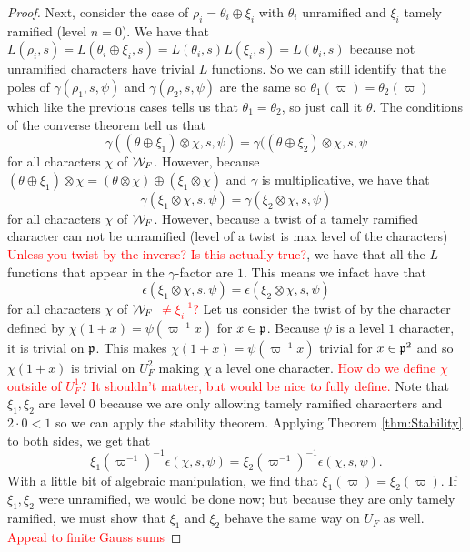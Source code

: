 \begin{proof}
  Next, consider the case of $\rho_i = \theta_i \oplus \xi_i$ with $\theta_i$ unramified and $\xi_i$ tamely ramified (level $n = 0$).
  We have that $L(\rho_i,s) = L(\theta_i \oplus \xi_i ,s) = L(\theta_i,s)L(\xi_i,s) = L(\theta_i,s)$ because not unramified characters have trivial $L$ functions.
  So we can still identify that the poles of $\gamma(\rho_1,s,\psi)$ and $\gamma(\rho_2,s,\psi)$ are the same so $\theta_1(\varpi) = \theta_2(\varpi)$ which like the previous cases tells us that $\theta_1 = \theta_2$, so just call it $\theta$.
  The conditions of the converse theorem tell us that
  \[ \gamma((\theta \oplus \xi_1) \otimes \chi,s,\psi) = \gamma((\theta \oplus \xi_2) \otimes \chi,s,\psi\]
  for all characters $\chi$ of $\mathcal{W}_F$.
  However, because $(\theta \oplus \xi_1)\otimes \chi = (\theta \otimes \chi) \oplus (\xi_1 \otimes \chi)$ and $\gamma$ is multiplicative, we have that
  \[\gamma (\xi_1 \otimes \chi,s,\psi) = \gamma(\xi_2 \otimes \chi,s,\psi)\]
  for all characters $\chi$ of $\mathcal{W}_F$.
  However, because a twist of a tamely ramified character can not be unramified (level of a twist is max level of the characters) \textcolor{red}{Unless you twist by the inverse? Is this actually true?}, we have that all the $L$-functions that appear in the $\gamma$-factor are $1$.
  This means we infact have that
  \[\epsilon(\xi_1 \otimes \chi , s, \psi) = \epsilon(\xi_2 \otimes \chi,s,\psi)\]
  for all characters $\chi$ of $\mathcal{W}_F$ \textcolor{red}{$\neq \xi_i^{-1}$?}
  Let us consider the twist of by the character defined by $\chi(1+x) = \psi(\varpi^{-1}x)$ for $x \in \mathfrak{p}$.
  Because $\psi$ is a level $1$ character, it is trivial on $\mathfrak{p}$.
  This makes $\chi(1+x) = \psi(\varpi^{-1}x)$ trivial for $x \in \mathfrak{p}^2$ and so $\chi(1+x)$ is trivial on $U_F^2$ making $\chi$ a level one character.
  \textcolor{red}{How do we define $\chi$ outside of $U^1_F$? It shouldn't matter, but would be nice to fully define.}
  Note that $\xi_1,\xi_2$ are level $0$ because we are only allowing tamely ramified characrters and $2 \cdot 0 < 1$ so we can apply the stability theorem.
  Applying Theorem \ref{thm:Stability} to both sides, we get that
  \[\xi_1(\varpi^{-1})^{-1}\epsilon(\chi,s,\psi) = \xi_2(\varpi^{-1})^{-1} \epsilon(\chi,s,\psi).\]
  With a little bit of algebraic manipulation, we find that $\xi_1(\varpi) = \xi_2(\varpi)$.
  If $\xi_1,\xi_2$ were unramified, we would be done now; but because they are only tamely ramified, we must show that $\xi_1$ and $\xi_2$ behave the same way on $U_F$ as well.
  \textcolor{red}{Appeal to finite Gauss sums}
\end{proof}


